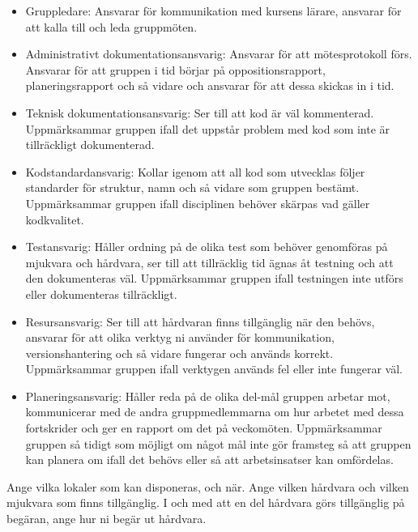 \documentclass{article}
\begin{document}
\begin{itemize}

\item Gruppledare: Ansvarar för kommunikation med kursens lärare, ansvarar
    för att kalla till och leda gruppmöten.

\item Administrativt dokumentationsansvarig: Ansvarar för att
    mötesprotokoll förs. Ansvarar för att gruppen i tid börjar på
    oppositionsrapport, planeringsrapport och så vidare och ansvarar för
    att dessa skickas in i tid.

\item Teknisk dokumentationsansvarig: Ser till att kod är väl kommenterad.
    Uppmärksammar gruppen ifall det uppstår problem med kod som inte är
    tillräckligt dokumenterad.

\item Kodstandardansvarig: Kollar igenom att all kod som utvecklas följer
    standarder för struktur, namn och så vidare som gruppen bestämt.
    Uppmärksammar gruppen ifall disciplinen behöver skärpas vad
    gäller kodkvalitet.

\item Testansvarig: Håller ordning på de olika test som behöver genomföras
    på mjukvara och hårdvara, ser till att tillräcklig tid ägnas åt
    testning och att den dokumenteras väl. Uppmärksammar gruppen ifall
    testningen inte utförs eller dokumenteras tillräckligt.

\item Resursansvarig: Ser till att hårdvaran finns tillgänglig när den
    behövs, ansvarar för att olika verktyg ni använder för
    kommunikation, versionshantering och så vidare fungerar och
    används korrekt. Uppmärksammar gruppen ifall verktygen används fel
    eller inte fungerar väl.

\item Planeringsansvarig: Håller reda på de olika del-mål gruppen arbetar mot, kommunicerar med de andra gruppmedlemmarna om hur arbetet med dessa fortskrider och ger en rapport om det på veckomöten. Uppmärksammar gruppen så tidigt som möjligt om något mål inte gör framsteg så att gruppen kan planera om ifall det behövs eller så att arbetsinsatser kan omfördelas.

    
\end{itemize}

Ange vilka lokaler som kan disponeras, och när. Ange vilken hårdvara och
vilken mjukvara som finns tillgänglig. I och med att en del hårdvara
görs tillgänglig på begäran, ange hur ni begär ut hårdvara.
\end{document}
